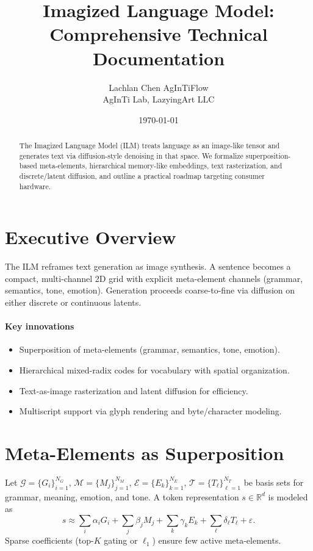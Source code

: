 \documentclass[11pt]{article}
\title{Imagized Language Model: Comprehensive Technical Documentation}
\author{\begin{tabular}{c}Lachlan Chen \quad AgInTiFlow\\AgInTi Lab, LazyingArt LLC\end{tabular}}
\date{\today}
\begin{document}
\maketitle

\begin{abstract}
The Imagized Language Model (ILM) treats language as an image-like tensor and generates text via diffusion-style denoising in that space. We formalize superposition-based meta-elements, hierarchical memory-like embeddings, text rasterization, and discrete/latent diffusion, and outline a practical roadmap targeting consumer hardware.
\end{abstract}

\tableofcontents

\section{Executive Overview}
The ILM reframes text generation as image synthesis. A sentence becomes a compact, multi-channel 2D grid with explicit meta-element channels (grammar, semantics, tone, emotion). Generation proceeds coarse-to-fine via diffusion on either discrete or continuous latents.

\paragraph{Key innovations}
\begin{itemize}[noitemsep,topsep=2pt]
  \item Superposition of meta-elements (grammar, semantics, tone, emotion).
  \item Hierarchical mixed-radix codes for vocabulary with spatial organization.
  \item Text-as-image rasterization and latent diffusion for efficiency.
  \item Multiscript support via glyph rendering and byte/character modeling.
\end{itemize}

\section{Meta-Elements as Superposition}
Let $\mathcal{G}{=}\{G_i\}_{i=1}^{N_G}$, $\mathcal{M}{=}\{M_j\}_{j=1}^{N_M}$, $\mathcal{E}{=}\{E_k\}_{k=1}^{N_E}$, $\mathcal{T}{=}\{T_\ell\}_{\ell=1}^{N_T}$ be basis sets for grammar, meaning, emotion, and tone. A token representation $s\in\mathbb{R}^d$ is modeled as
\begin{equation}
  s \approx \sum_{i} \alpha_i G_i + \sum_{j} \beta_j M_j + \sum_{k} \gamma_k E_k + \sum_{\ell} \delta_\ell T_\ell + \varepsilon.
\end{equation}
Sparse coefficients (top-$K$ gating or $\ell_1$) ensure few active meta-elements.
\end{document}
